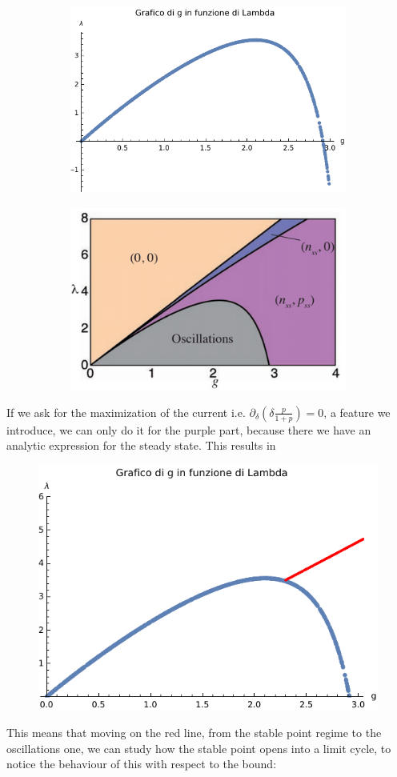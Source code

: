 \documentclass{article}
\begin{document}
	\begin{figure}[h!]
		
		\begin{subfigure}{\textwidth}
			\includegraphics[width=0.45\linewidth]{plotPP.pdf}
		\end{subfigure}
		\begin{subfigure}{\textwidth}
			\includegraphics[width=0.45\linewidth]{Yan.png}
		\end{subfigure}
	\end{figure}
	If we ask for the maximization of the current i.e. $\partial_{\delta} (\delta \frac{p}{1+p})=0$, a feature we introduce, we can only do it for the purple part, because there we have an analytic expression for the steady state. This results in
	
	
	\begin{figure}[H]
		\begin{center}
			\includegraphics[width=0.4\linewidth]{plotmax.pdf}
		\end{center}
	\end{figure}
	
	This means that moving on the red line, from the stable point regime to the oscillations one, we can study how the stable point opens into a limit cycle, to notice the behaviour of this with respect to the bound:
	
\end{document}
